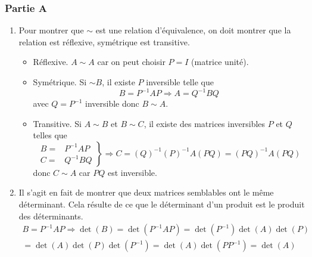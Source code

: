 \subsubsection*{Partie A}
\begin{enumerate}
 \item Pour montrer que $\sim$ est une relation d'équivalence, on doit montrer que la relation est réflexive, symétrique est transitive.
\begin{itemize}
 \item Réflexive. $A\sim A$ car on peut choisir $P=I$ (matrice unité).
\item Symétrique. Si $\sim B$, il existe $P$ inversible telle que 
\begin{displaymath}
 B=P^{-1}AP \Rightarrow A = Q^{-1}BQ
\end{displaymath}
avec $Q=P^{-1}$ inversible donc $B\sim A$.
\item Transitive. Si $A\sim B$ et $B\sim C$, il existe des matrices inversibles $P$ et $Q$ telles que 
\begin{displaymath}
 \left. 
\begin{aligned}
 B =& P^{-1}AP\\
 C =& Q^{-1}BQ
\end{aligned}
\right\rbrace 
\Rightarrow
C=(Q)^{-1}(P)^{-1}A(PQ)=(PQ)^{-1}A(PQ)
\end{displaymath}
donc $C\sim A$ car $PQ$ est inversible.
\end{itemize}

\item Il s'agit en fait de montrer que deux matrices semblables ont le même déterminant. Cela résulte de ce que le déterminant d'un produit est le produit des déterminants.
\begin{multline*}
 B=P^{-1}AP \Rightarrow \det (B) =\det(P^{-1}AP)=\det(P^{-1})\det(A)\det(P)\\=\det(A)\det(P)\det(P^{-1})
= \det(A)\det(PP^{-1})=\det(A)
\end{multline*}


\end{enumerate}
